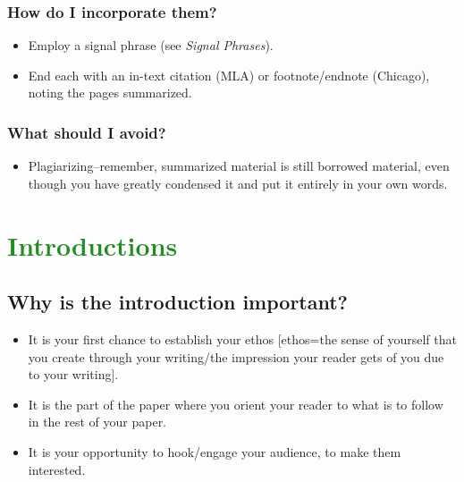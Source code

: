 \documentclass[12pt, hidelinks]{article} %
\begin{document}
\subsubsection{How do I incorporate them?}

\begin{itemize}
\item Employ a signal phrase (see \emph{Signal Phrases}).

\item End each with an in-text citation (MLA) or footnote/endnote (Chicago), noting the pages summarized.
\end{itemize}

\subsubsection{What should I avoid?}
\begin{itemize}

\item Plagiarizing--remember, summarized material is still borrowed material, even though you have greatly condensed it and put it entirely in your own words.
 \end{itemize}


\section{\textcolor{ForestGreen}{Introductions}}


 
\subsection {Why is the introduction important?}
 
\begin{itemize}
\item It is your first chance to establish your ethos [ethos=the sense of yourself that you create through your writing/the impression your reader gets of you due to your writing].
 
\item It is the part of the paper where you orient your reader to what is to follow in the rest of your paper.
 
\item It is your opportunity to hook/engage your audience, to make them interested.
\end{itemize}
\end{document}
